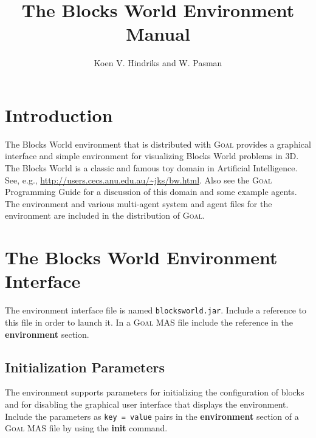 \documentclass{article}
\newcommand{\GOAL}{\textsc{Goal}\xspace}
\begin{document}
%
%
%
\title{The Blocks World Environment Manual}
\author{Koen V. Hindriks and W. Pasman}
\maketitle

%
%
%
\section{Introduction}
%
The Blocks World environment that is distributed with \GOAL provides a
graphical interface and simple environment for visualizing Blocks World problems in 3D. The Blocks World is a classic and famous toy domain in Artificial Intelligence. See, e.g., \url{http://users.cecs.anu.edu.au/~jks/bw.html}. Also see the \GOAL Programming Guide for a discussion of this domain and some example agents. The environment and various multi-agent system and agent files for the environment are included in the distribution of \GOAL.

%
%
%
\section{The Blocks World Environment Interface}
%
 
The environment interface file is named \texttt{blocksworld.jar}. Include a reference to this file in order to launch it. In a \GOAL MAS file include the reference in the \textbf{environment} section.

%
%
%
\subsection{Initialization Parameters}
%
The environment supports parameters for initializing the configuration of blocks and for disabling the graphical user interface that displays the environment. Include the parameters as \texttt{key = value} pairs in the \textbf{environment} section of a \GOAL MAS file by using the \textbf{init} command.
\end{document}
